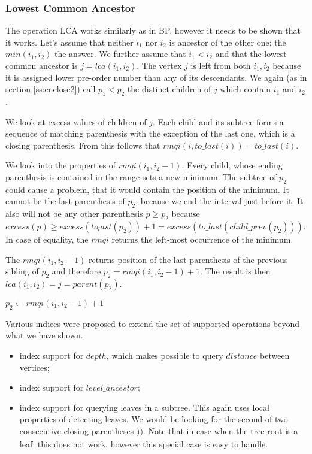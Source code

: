 \subsubsection{Lowest Common Ancestor}

The operation LCA works similarly as in BP, however it needs to be shown that it works.
Let's assume that neither $i_1$ nor $i_2$ is ancestor of the other one; the $min(i_1, i_2)$ the answer.
We further assume that $i_1 < i_2$ and that the lowest common ancestor is $j = lca(i_1, i_2)$.
The vertex $j$ is left from both $i_1, i_2$ because it is assigned lower pre-order number than any of its descendants.
We again (as in section \ref{ss:enclose2}) call $p_1 < p_2$ the distinct children of $j$ which contain $i_1$ and $i_2$.

We look at excess values of children of $j$.
Each child and its subtree forms a sequence of matching parenthesis with the exception of the last one, which is a closing parenthesis.
From this follows that $rmqi(i, to\_last(i)) = to\_last(i)$.

We look into the properties of $rmqi(i_1, i_2 - 1)$.
Every child, whose ending parenthesis is contained in the range sets a new minimum.
The subtree of $p_2$ could cause a problem, that it would contain the position of the minimum.
It cannot be the last parenthesis of $p_2$, because we end the interval just before it.
It also will not be any other parenthesis $p \ge p_2$ because $excess(p) \ge excess(to_last(p_2)) + 1 = excess(to\_last(child\_prev(p_2)))$.
In case of equality, the $rmqi$ returns the left-most occurrence of the minimum.

The $rmqi(i_1, i_2 - 1)$ returns position of the last parenthesis of the previous sibling of $p_2$ and therefore $p_2 = rmqi(i_1, i_2 - 1) + 1$.
The result is then $lca(i_1, i_2) = j = parent(p_2)$.

\begin{algorithmic}
		\State {}
		\State {}
	\Else
		\State $p_2 \gets rmqi(i_1, i_2 - 1) + 1$
		\State {}
	\EndIf
\EndFunction
\end{algorithmic}

\bigskip

Various indices were proposed to extend the set of supported operations beyond what we have shown.
\begin{itemize}
	\item index support for $depth$, which makes possible to query $distance$ between vertices;
	\item index support for $level\_ancestor$;
	\item index support for querying leaves in a subtree.
	This again uses local properties of detecting leaves.
	We would be looking for the second of two consecutive closing parentheses $)\underline{)}$.
	Note that in case when the tree root is a leaf, this does not work, however this special case is easy to handle.
\end{itemize}

